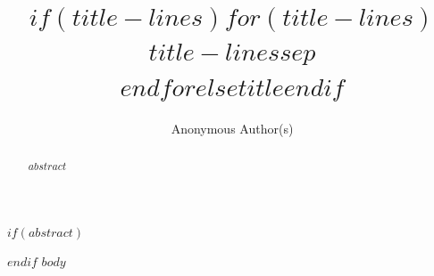 \documentclass{article}
\title{$if(title-lines)$$for(title-lines)$$title-lines$$sep$\\$endfor$$else$$title$$endif$}
\author{Anonymous Author(s)}
\begin{document}
\maketitle
$if(abstract)$
\begin{abstract}
$abstract$
\end{abstract}
$endif$
$body$
\clearpage
{\small


}
\end{document}
